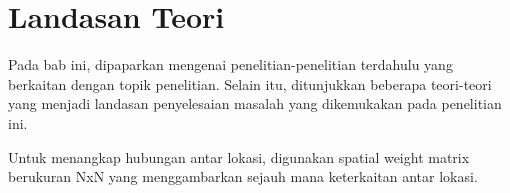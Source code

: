 \chapter{Landasan Teori}
Pada bab ini, dipaparkan mengenai penelitian-penelitian terdahulu yang berkaitan dengan topik penelitian. Selain itu, ditunjukkan beberapa teori-teori yang menjadi landasan penyelesaian masalah yang dikemukakan pada penelitian ini.






Untuk menangkap hubungan antar lokasi, digunakan spatial weight matrix berukuran NxN yang menggambarkan sejauh mana keterkaitan antar lokasi.
